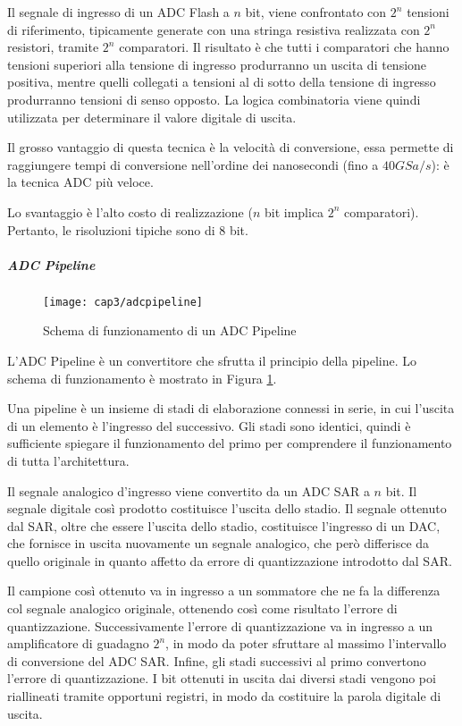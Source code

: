Il segnale di ingresso di un ADC Flash a $n$ bit, viene confrontato con $2^n$ tensioni di riferimento, tipicamente generate con una stringa resistiva realizzata con $2^n$ resistori, tramite $2^n$ comparatori. Il risultato è che tutti i comparatori che hanno tensioni superiori alla tensione di ingresso produrranno un uscita di tensione positiva, mentre quelli collegati a tensioni al di sotto della tensione di ingresso produrranno tensioni di senso opposto. La logica combinatoria viene quindi utilizzata per determinare il valore digitale di uscita.

Il grosso vantaggio di questa tecnica è la velocità di conversione, essa permette di raggiungere tempi di conversione nell'ordine dei nanosecondi (fino a $40 GSa/s$): è la tecnica ADC più veloce. 

Lo svantaggio è l'alto costo di realizzazione ($n$ bit implica $2^n$ comparatori). Pertanto, le risoluzioni tipiche sono di $8$ bit.

\subparagraph{\textbf{ADC Pipeline}}
\begin{figure}  
  \begin{center}
    \texttt{[image: cap3/adcpipeline]}
    \caption{Schema di funzionamento di un ADC Pipeline }
    \label{adcpipeline}
  \end{center}
\end{figure}
L'ADC Pipeline è un convertitore che sfrutta il principio della pipeline. Lo schema di funzionamento è mostrato in Figura \ref{adcpipeline}.

Una pipeline è un insieme di stadi di elaborazione connessi in serie, in cui l'uscita di un elemento è l'ingresso del successivo. Gli stadi sono identici, quindi è sufficiente spiegare il funzionamento del primo per comprendere il funzionamento di tutta l'architettura.

Il segnale analogico d'ingresso viene convertito da un ADC SAR a $n$ bit. Il segnale digitale così prodotto costituisce l'uscita dello stadio. Il segnale ottenuto dal SAR, oltre che essere l'uscita dello stadio, costituisce l'ingresso di un DAC, che fornisce in uscita nuovamente un segnale analogico, che però differisce da quello originale in quanto affetto da errore di quantizzazione introdotto dal SAR.

Il campione così ottenuto va in ingresso a un sommatore che ne fa la differenza col segnale analogico originale, ottenendo così come risultato l'errore di quantizzazione. Successivamente l'errore di quantizzazione va in ingresso a un amplificatore di guadagno $2^n$, in modo da poter sfruttare al massimo l'intervallo di conversione del ADC SAR. Infine, gli stadi successivi al primo convertono l'errore di quantizzazione. I bit ottenuti in uscita dai diversi stadi vengono poi riallineati tramite opportuni registri, in modo da costituire la parola digitale di uscita. 

